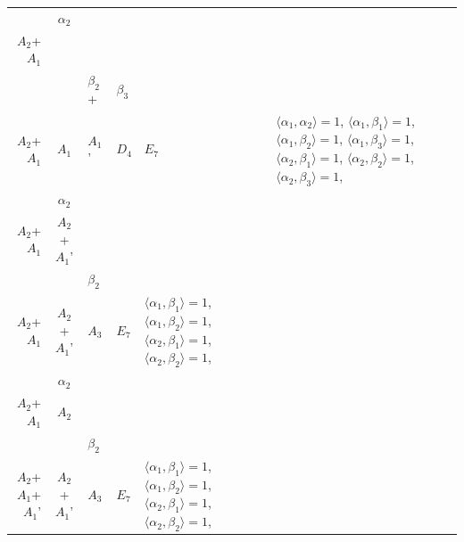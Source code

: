 \documentclass[12pt]{report}
\begin{document}
\begin{appendix}
{\begin{longtable}{rcl p{1cm}p{1cm}p{3cm} }
\\
\begin{tabular}{cc}$\alpha_1$+ & $\alpha_2$\\\tiny{ $A_2$+$A_1$ } & \tiny{  }\end{tabular} &\begin{tabular}{c} = \\~ \end{tabular} & \begin{tabular}{ccc}$\beta_1$+ & $\beta_2$+ & $\beta_3$\\\tiny{ $A_2$+$A_1$ } & \tiny{ $A_1$ } & \tiny{ $A_1$' }\end{tabular} & $D_4$ & $E_7$ & $\langle\alpha_1, \alpha_2\rangle=1$,  $\langle\alpha_1, \beta_1\rangle=1$, $\langle\alpha_1, \beta_2\rangle=1$, $\langle\alpha_1, \beta_3\rangle=1$, $\langle\alpha_2, \beta_1\rangle=1$, $\langle\alpha_2, \beta_2\rangle=1$, $\langle\alpha_2, \beta_3\rangle=1$, 
\\
\begin{tabular}{cc}$\alpha_1$+ & $\alpha_2$\\\tiny{ $A_2$+$A_1$ } & \tiny{ $A_2$+$A_1$' }\end{tabular} &\begin{tabular}{c} = \\~ \end{tabular} & \begin{tabular}{cc}$\beta_1$+ & $\beta_2$\\\tiny{ $A_2$+$A_1$ } & \tiny{ $A_2$+$A_1$' }\end{tabular} & $A_3$ & $E_7$ &  $\langle\alpha_1, \beta_1\rangle=1$, $\langle\alpha_1, \beta_2\rangle=1$, $\langle\alpha_2, \beta_1\rangle=1$, $\langle\alpha_2, \beta_2\rangle=1$, 
\\
\begin{tabular}{cc}$\alpha_1$+ & $\alpha_2$\\\tiny{ $A_2$+$A_1$ } & \tiny{ $A_2$ }\end{tabular} &\begin{tabular}{c} = \\~ \end{tabular} & \begin{tabular}{cc}$\beta_1$+ & $\beta_2$\\\tiny{ $A_2$+$A_1$+$A_1$' } & \tiny{ $A_2$+$A_1$' }\end{tabular} & $A_3$ & $E_7$ &  $\langle\alpha_1, \beta_1\rangle=1$, $\langle\alpha_1, \beta_2\rangle=1$, $\langle\alpha_2, \beta_1\rangle=1$, $\langle\alpha_2, \beta_2\rangle=1$, 
\\

\end{longtable}}
\end{appendix}
\end{document}
